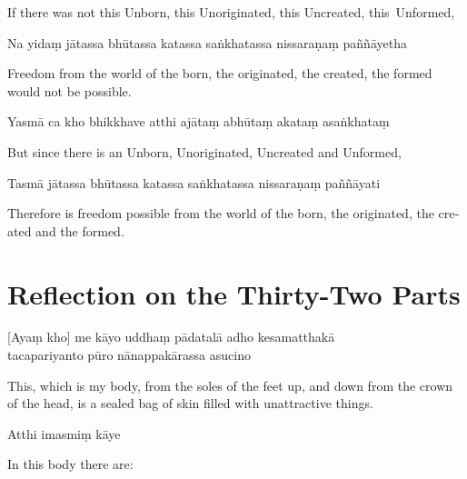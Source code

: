 \begin{english}
  If there was not this Unborn, this Unoriginated, this Uncreated, this~Unformed,
\end{english}

Na yidaṃ jātassa bhūtassa katassa saṅkhatassa nissaraṇaṃ paññāyetha

\begin{english}
  Freedom from the world of the born, the originated, the created, the formed would not be possible.
\end{english}

Yasmā ca kho bhikkhave atthi ajātaṃ abhūtaṃ akataṃ asaṅkhataṃ

\begin{english}
  But since there is an Unborn, Unoriginated, Uncreated and Unformed,
\end{english}

Tasmā jātassa bhūtassa katassa saṅkhatassa nissaraṇaṃ paññāyati

\begin{english}
  Therefore is freedom possible from the world of the born, the originated, the created and the formed.
\end{english}


\section{Reflection on the Thirty-Two Parts}


\begin{leader}
\end{leader}

[Ayaṃ kho] me kāyo uddhaṃ pādatalā adho kesamatthakā\\
tacapariyanto pūro nānappakārassa asucino

\begin{english}
  This, which is my body, from the soles of the feet up, and down from the crown of the head, is a sealed bag of skin filled with unattractive things.
\end{english}

Atthi imasmiṃ kāye

\begin{english}
  In this body there are:
\end{english}

